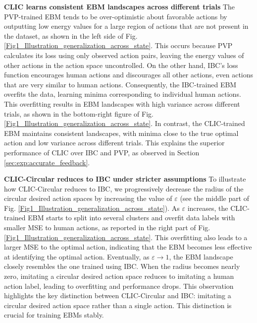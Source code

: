 \textbf{CLIC learns consistent EBM landscapes across different trials}
 The PVP-trained EBM tends to be over-optimistic about favorable actions by outputting low energy values for a large region of actions that are not present in the dataset, as shown in the left side of Fig. \ref{Fig1_Illustration_generalization_across_state}.
 This occurs because PVP calculates its loss using only observed action pairs, leaving the energy values of other actions in the action space uncontrolled. 
  On the other hand, IBC's loss function encourages human actions and discourages all other actions, even actions that are very similar to human actions. Consequently, the IBC-trained EBM overfits the data, learning minima corresponding to individual human actions. 
  This overfitting results in EBM landscapes with high variance across different trials, as shown in the bottom-right figure of Fig. \ref{Fig1_Illustration_generalization_across_state}.
 In contrast, the CLIC-trained EBM maintains consistent landscapes, with minima close to the true optimal action and low variance across different trials.
 This explains the superior performance of  CLIC over IBC and PVP, as observed in Section \ref{sec:exp:accurate_feedback}.
 


\textbf{CLIC-Circular reduces to IBC under stricter assumptions}
To illustrate how CLIC-Circular reduces to IBC, we progressively decrease the radius of the circular desired action spaces by increasing the value of $\varepsilon$ (see the middle part of Fig. \ref{Fig1_Illustration_generalization_across_state}). 
As $\varepsilon$ increases, the CLIC-trained EBM starts to split into several clusters and overfit data labels with smaller MSE to human actions, as reported in the right part of Fig. \ref{Fig1_Illustration_generalization_across_state}.
 This overfitting also leads to a larger MSE to the optimal action, indicating that the EBM becomes less effective at identifying the optimal action.
Eventually, as $\varepsilon \rightarrow 1$,  the EBM landscape closely resembles the one trained using IBC.
When the radius becomes nearly zero, imitating a circular desired action space reduces to imitating a human action label, leading to overfitting and performance drops. 
This observation highlights the key distinction between CLIC-Circular and IBC: imitating a circular desired action space rather than a single action. This distinction is crucial for training EBMs stably.





